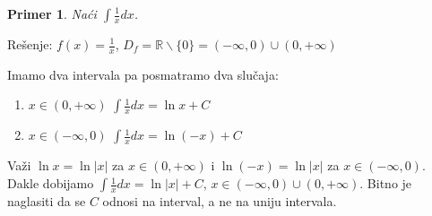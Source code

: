 \documentclass{article}
\newtheorem{prim}{Primer}[section]
\begin{document}
\begin{primbox}
    \begin{prim}
        Naći $\int\frac{1}{x}dx$.
    \end{prim}

    Rešenje: $f(x) = \frac{1}{x}$,
    $D_f= \mathbb{R}\backslash \{0\} =
        (-\infty, 0)\cup(0, +\infty)$\par
    Imamo dva intervala pa posmatramo dva slučaja:
    \begin{enumerate}[leftmargin=2cm, label=\arabic*. slučaj:]
        \item $x \in (0, +\infty)$ $\int \frac{1}{x}dx =
                  \ln x + C$
        \item $x \in (-\infty, 0)$ $\int \frac{1}{x}dx =
                  \ln(-x) + C$
    \end{enumerate}
    Važi $\ln x = \ln |x|$ za $x\in(0,+\infty)$  i
    $\ln (-x) = \ln |x|$ za $x\in(-\infty,0)$.
    Dakle dobijamo $\int\frac{1}{x}dx=\ln|x| + C$,
    $x\in(-\infty, 0)\cup(0, +\infty)$. Bitno je
    naglasiti da se $C$ odnosi na interval, a ne na
    uniju intervala.
\end{primbox}
\end{document}
